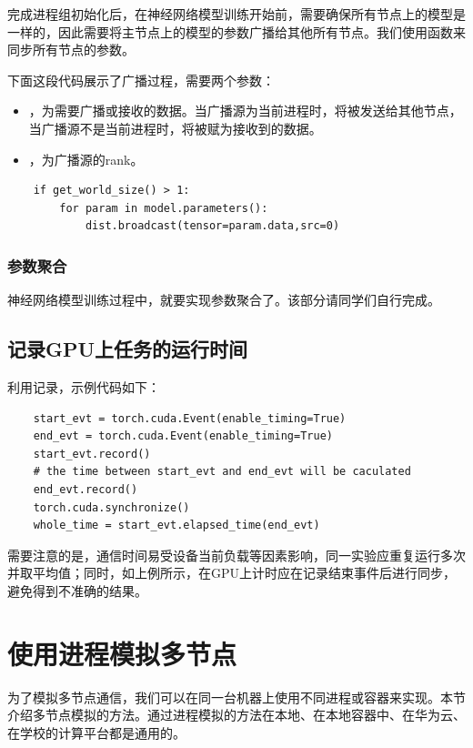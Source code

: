 完成进程组初始化后，在神经网络模型训练开始前，需要确保所有节点上的模型是一样的，因此需要将主节点上的模型的参数广播给其他所有节点。我们使用函数来同步所有节点的参数。

下面这段代码展示了广播过程，需要两个参数：
\begin{itemize}
    \item {}，为需要广播或接收的数据。当广播源为当前进程时，将被发送给其他节点，当广播源不是当前进程时，将被赋为接收到的数据。
    \item {}，为广播源的rank。
\end{itemize}

\begin{lstlisting}
    if get_world_size() > 1:
        for param in model.parameters():
            dist.broadcast(tensor=param.data,src=0)
\end{lstlisting}

\subsubsection{参数聚合}

神经网络模型训练过程中，就要实现参数聚合了。该部分请同学们自行完成。

\subsection{记录GPU上任务的运行时间}

利用记录，示例代码如下：
\begin{lstlisting}
    start_evt = torch.cuda.Event(enable_timing=True)
    end_evt = torch.cuda.Event(enable_timing=True)
    start_evt.record()
    # the time between start_evt and end_evt will be caculated
    end_evt.record()
    torch.cuda.synchronize()
    whole_time = start_evt.elapsed_time(end_evt)
\end{lstlisting}

需要注意的是，通信时间易受设备当前负载等因素影响，同一实验应重复运行多次并取平均值；同时，如上例所示，在GPU上计时应在记录结束事件后进行同步，避免得到不准确的结果。

\section{使用进程模拟多节点}

为了模拟多节点通信，我们可以在同一台机器上使用不同进程或容器来实现。本节介绍多节点模拟的方法。通过进程模拟的方法在本地、在本地容器中、在华为云、在学校的计算平台都是通用的。

